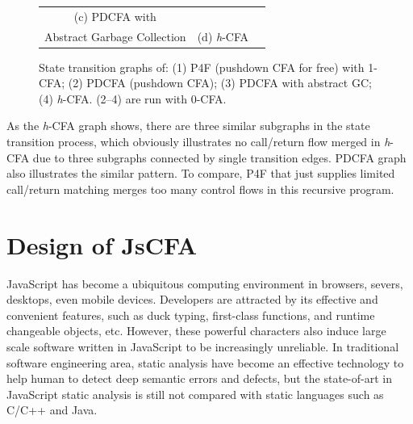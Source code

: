 \documentclass{article}
\begin{document}
\begin{figure}
\begin{center}
\begin{tabular}{ccc}
\\
(c) PDCFA with \\Abstract Garbage Collection
&
(d) \textit{h}-CFA
\end{tabular}
\end{center}
\caption[State transition graphs]{
State transition graphs of: (1) P4F (pushdown CFA for free) with 1-CFA\@;
(2) PDCFA (pushdown CFA); (3) PDCFA with abstract GC\@; (4) \textit{h}-CFA\@.
(2--4) are run with 0-CFA\@.
}
\label{fig:state-graphs}
\end{figure}
As the \textit{h}-CFA graph shows, there are three similar subgraphs in the state transition process, which obviously illustrates
no call/return flow merged in \textit{h}-CFA due to three subgraphs connected by single transition edges.
PDCFA graph also illustrates the similar pattern.
To compare, P4F that just supplies limited call/return matching merges too many control flows in this recursive program.

\section{Design of JsCFA}
\label{sec:JsCFA}
JavaScript has become a ubiquitous computing environment in browsers, severs, desktops, even mobile devices. Developers are attracted by its effective and convenient features, such as duck typing, first-class functions, and runtime changeable objects, etc. However, these powerful characters also induce large scale software written in JavaScript to be increasingly unreliable.
In traditional software engineering area, static analysis have become an effective technology to help human to detect deep semantic errors and defects, but the state-of-art in JavaScript static analysis is still not compared with static languages such as C/C++ and Java.
\end{document}
